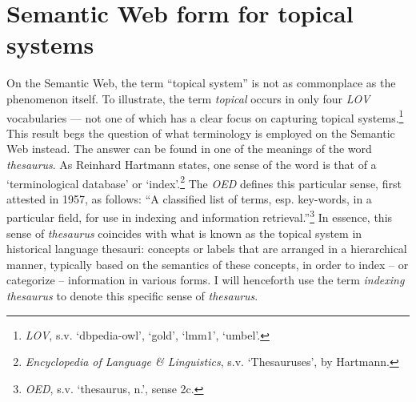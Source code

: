 \section{Semantic Web form for topical systems}
\label{sect:Stolk_thes-digital-form:semweb-topicalsystem}
On the Semantic Web, the term ``topical system'' is not as commonplace as the phenomenon itself. To illustrate, the term \textit{topical} occurs in only four \textit{LOV} vocabularies --- not one of which has a clear focus on capturing topical systems.\footnote{\textit{LOV}, s.v. `dbpedia-owl', `gold', `lmm1', `umbel'.} This result begs the question of what terminology is employed on the Semantic Web instead. The answer can be found in one of the meanings of the word \textit{thesaurus}. As Reinhard Hartmann states, one sense of the word is that of a `terminological database' or `index'.\footnote{\textit{Encyclopedia of Language \& Linguistics}, s.v. `Thesauruses', by Hartmann.} The \textit{OED} defines this particular sense, first attested in 1957, as follows: ``A classified list of terms, esp. key-words, in a particular field, for use in indexing and information retrieval.''\footnote{\textit{OED}, s.v. `thesaurus, n.', sense 2c.} In essence, this sense of \textit{thesaurus} coincides with what is known as the topical system in historical language thesauri: concepts or labels that are arranged in a hierarchical manner, typically based on the semantics of these concepts, in order to index -- or categorize -- information in various forms. I will henceforth use the term \textit{indexing thesaurus} to denote this specific sense of \textit{thesaurus}.

